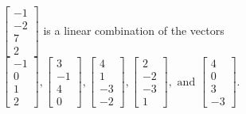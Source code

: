 \begin{exercise}
\begin{exerciseStatement}
  \end{exerciseStatement}
  \begin{exerciseAnswer}
   \(\left[\begin{array}{c}
-1 \\
-2 \\
7 \\
2
\end{array}\right]\) 
  	 is  
	a linear combination of the vectors \(\left[\begin{array}{c}
-1 \\
0 \\
1 \\
2
\end{array}\right] , \left[\begin{array}{c}
3 \\
-1 \\
4 \\
0
\end{array}\right] , \left[\begin{array}{c}
4 \\
1 \\
-3 \\
-2
\end{array}\right] , \left[\begin{array}{c}
2 \\
-2 \\
-3 \\
1
\end{array}\right] , \text{ and } \left[\begin{array}{c}
4 \\
0 \\
3 \\
-3
\end{array}\right]\).

	
  


  \end{exerciseAnswer}
\end{exercise}